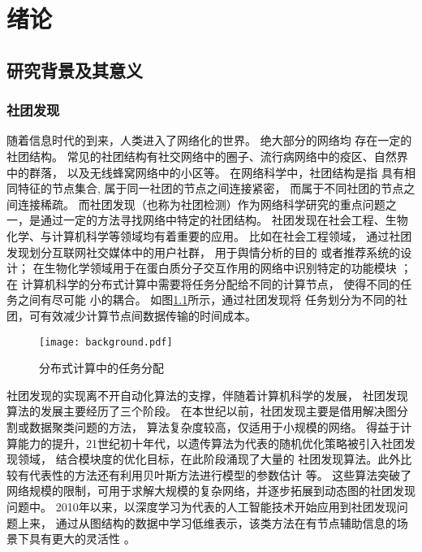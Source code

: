 
\chapter{绪论}


\section{研究背景及其意义}
\subsection{社团发现}\label{sec:community}
随着信息时代的到来，人类进入了网络化的世界。
绝大部分的网络均
存在一定的社团结构\cite{wang2012network}。
常见的社团结构有社交网络中的圈子、流行病网络中的疫区、自然界中的群落，
以及无线蜂窝网络中的小区等。
在网络科学中，社团结构是指
具有相同特征的节点集合, 属于同一社团的节点之间连接紧密，
而属于不同社团的节点之间连接稀疏。
而社团发现（也称为社团检测）作为网络科学研究的重点问题之一，是通过一定的方法寻找网络中特定的社团结构。
社团发现在社会工程、生物化学、与计算机科学等领域均有着重要的应用。
比如在社会工程领域，
通过社团发现划分互联网社交媒体中的用户社群\cite{zalmout2013twitter}，
用于舆情分析的目的\cite{yang2018opinion}
或者推荐系统的设计\cite{cao2015recommendation}；
在生物化学领域用于在蛋白质分子交互作用的网络中识别特定的功能模块 \cite{ayati2015mobas}；
在
计算机科学的分布式计算中需要将任务分配给不同的计算节点，
使得不同的任务之间有尽可能
小的耦合\cite{topcuoglu2002performance}。
如图\ref{fig:distributed_computing}所示，通过社团发现将
任务划分为不同的社团，可有效减少计算节点间数据传输的时间成本。

\begin{figure}[!ht]
    \centering
    \texttt{[image: background.pdf]}
    \caption{分布式计算中的任务分配\protect\footnotemark}
    \label{fig:distributed_computing}
\end{figure}


社团发现的实现离不开自动化算法的支撑，伴随着计算机科学的发展，
社团发现算法的发展主要经历了三个阶段。
在本世纪以前，社团发现主要是借用解决图分割或数据聚类问题的方法，
算法复杂度较高，仅适用于小规模的网络。
得益于计算能力的提升，21世纪初十年代，以遗传算法为代表的随机优化策略被引入社团发现领域，
结合模块度的优化目标，在此阶段涌现了大量的
社团发现算法。此外比较有代表性的方法还有利用贝叶斯方法进行模型的参数估计 \cite{jin2023survey}
等。
这些算法突破了网络规模的限制，可用于求解大规模的复杂网络，并逐步拓展到动态图的社团发现问题中。
2010年以来，以深度学习为代表的人工智能技术开始应用到社团发现问题上来，
通过从图结构的数据中学习低维表示，该类方法在有节点辅助信息的场景下具有更大的灵活性
\cite{Su_2022}。

